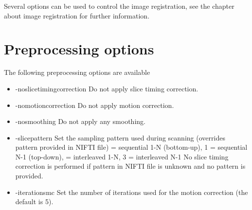 Several options can be used to control the image registration, see the chapter about image registration for further information.

\newpage
\section{Preprocessing options}

The following preprocessing options are available

\begin{itemize}

\item -noslicetimingcorrection
\newline \newline Do not apply slice timing correction. \newline

\item -nomotioncorrection
\newline \newline Do not apply motion correction. \newline

\item -nosmoothing
\newline \newline Do not apply any smoothing. \newline

\item -slicepattern
\newline \newline Set the sampling pattern used during scanning \newline
 				  (overrides pattern provided in NIFTI file)  = sequential 1-N (bottom-up), 1 = sequential N-1 (top-down),  = interleaved 1-N, 3 = interleaved N-1 \newline \newline
                  No slice timing correction is performed if pattern in \newline
                  NIFTI file is unknown and no pattern is provided. 

\item -iterationsmc 
\newline \newline Set the number of iterations used for the \newline motion correction (the default is 5).


\end{itemize}
